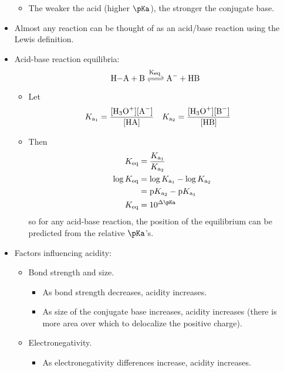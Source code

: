 \documentclass[../notes.tex]{subfiles}
\begin{document}
\begin{itemize}
\begin{itemize}
        \item The weaker the acid (higher $\pKa$), the stronger the conjugate base.
    \end{itemize}
    \item Almost any reaction can be thought of as an acid/base reaction using the Lewis definition.
    \item Acid-base reaction equilibria:
    \begin{equation*}
        \ce{H-A + B <=>[K\textsubscript{eq}] A- + HB}
    \end{equation*}
    \begin{itemize}
        \item Let
        \begin{align*}
            K_{\text{a}_1} &= \frac{[\ce{H3O+}][\ce{A-}]}{[\ce{HA}]}&
            K_{\text{a}_2} &= \frac{[\ce{H3O+}][\ce{B-}]}{[\ce{HB}]}
        \end{align*}
        \item Then
        \begin{align*}
            K_\text{eq} &= \frac{K_{\text{a}_1}}{K_{\text{a}_2}}\\
            \log K_\text{eq} &= \log K_{\text{a}_1}-\log K_{\text{a}_2}\\
            &= \text{p}K_{\text{a}_2}-\text{p}K_{\text{a}_1}\\
            K_\text{eq} &= 10^{\Delta\pKa}
        \end{align*}
        so for any acid-base reaction, the position of the equilibrium can be predicted from the relative $\pKa$'s.
    \end{itemize}
    \item Factors influencing acidity:
    \begin{itemize}
        \item Bond strength and size.
        \begin{itemize}
            \item As bond strength decreases, acidity increases.
            \item As size of the conjugate base increases, acidity increases (there is more area over which to delocalize the positive charge).
        \end{itemize}
        \item Electronegativity.
        \begin{itemize}
            \item As electronegativity differences increase, acidity increases.
        \end{itemize}

\end{itemize}
\end{itemize}
\end{document}
